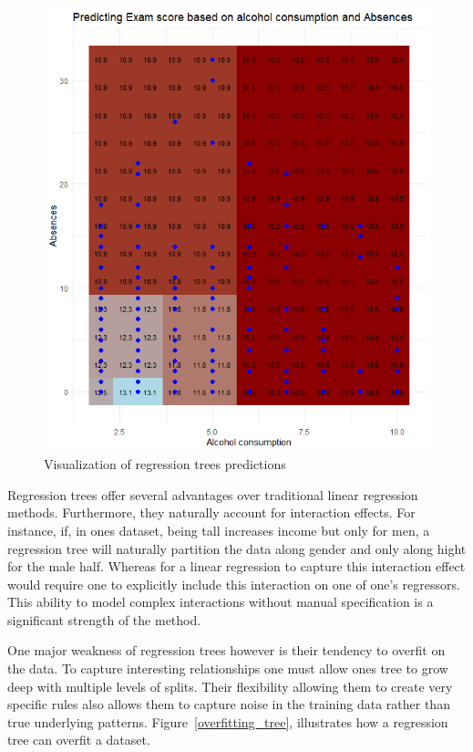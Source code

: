 \documentclass[12pt]{article}
\begin{document}
\begin{figure}
    \includegraphics[scale=0.40]{red_visual.png}
    \caption{Visualization of regression trees predictions}
    \label{red_visual}
\end{figure}

Regression trees offer several advantages over traditional linear regression methods.  Furthermore, they naturally account for interaction effects. For instance, if, in ones dataset, being tall increases income but only for men, a regression tree will naturally partition the data along gender and only along hight for the male half. Whereas for a linear regression to capture this interaction effect would require one to explicitly include this interaction on one of one's regressors. This ability to model complex interactions without manual specification is a significant strength of the method.

One major weakness of regression trees however is their tendency to overfit on the data. To capture interesting relationships one must allow ones tree to grow deep with multiple levels of splits. Their flexibility allowing them to create very specific rules also allows them to capture noise in the training data rather than true underlying patterns. Figure~\ref{overfitting_tree}, illustrates how a regression tree can overfit a dataset.
\end{document}
